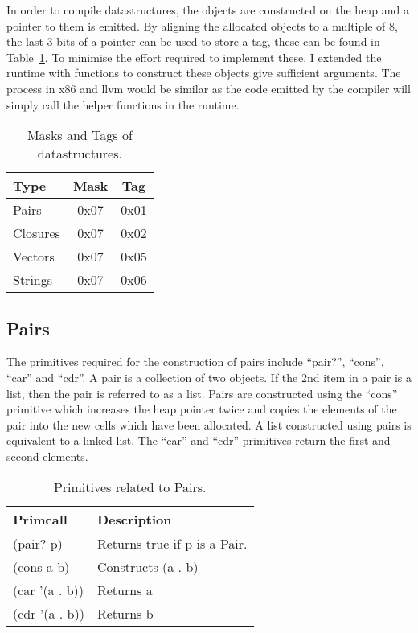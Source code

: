 \documentclass{article}
\begin{document}
In order to compile datastructures, the objects are constructed on the heap and a pointer to them is emitted. By aligning the allocated objects to a multiple of 8, the last 3 bits of a pointer can be used to store a tag, these can be found in Table~\ref{tab:datastructures}. To minimise the effort required to implement these, I extended the runtime with functions to construct these objects give sufficient arguments. The process in x86 and llvm would be similar as the code emitted by the compiler will simply call the helper functions in the runtime.

\begin{table}[ht]
  \centering
\begin{tabular}{ l c c }
  \toprule
  Type & Mask & Tag  \\ \hline
  \midrule
  Pairs  & 0x07 & 0x01 \\
  Closures & 0x07 & 0x02 \\
  Vectors & 0x07 & 0x05 \\
  Strings & 0x07 & 0x06 \\
  \bottomrule
\end{tabular}
\caption{Masks and Tags of datastructures.} \label{tab:datastructures}
\end{table}

\subsection{Pairs}

The primitives required for the construction of pairs include ``pair?'', ``cons'', ``car'' and ``cdr''. A pair is a collection of two objects. If the 2nd item in a pair is a list, then the pair is referred to as a list. Pairs are constructed using the ``cons'' primitive which increases the heap pointer twice and copies the elements of the pair into the new cells which have been allocated. A list constructed using pairs is equivalent to a linked list. The ``car'' and ``cdr'' primitives return the first and second elements.

\begin{table}[ht]
  \centering
\begin{tabular}{ l l }
  \toprule
  Primcall & Description \\ \hline
  \midrule
  (pair? p) & Returns true if p is a Pair.   \\
  (cons a b) & Constructs (a . b)  \\
  (car '(a . b)) & Returns a \\
  (cdr '(a . b)) & Returns b \\
  \bottomrule
\end{tabular}
\caption{Primitives related to Pairs.} \label{tab:pairs}
\end{table}
\end{document}
